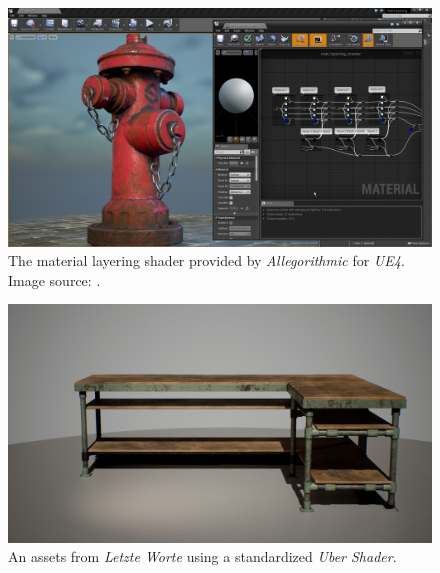 \begin{figure}
	\centering
	\includegraphics[width=0.7\linewidth]{images/07cha_09_ue4_shader_render.jpg}
	\caption{The material layering shader provided by \emph{Allegorithmic} for \emph{UE4}. Image source: \cite{allegorithmic2016matlay}.}
	\label{fig:uberue4shaderrender}
\end{figure}

\begin{figure}
	\centering
	\includegraphics[width=0.7\linewidth]{images/07cha_10_pattern_LeaAssets_Furniture.jpg}
	\caption{ An assets from \emph{Letzte Worte} using a standardized \emph{Uber Shader}. }
	\label{fig:leaFurniture}
\end{figure}

